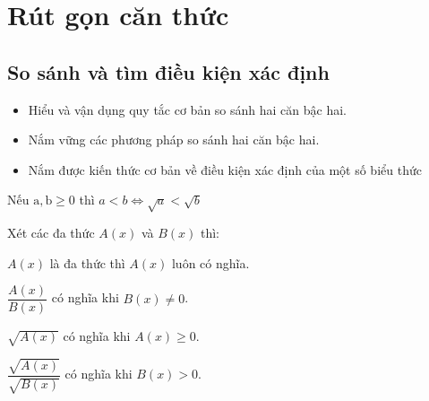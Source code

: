 \titlespacing*{\subsubsection}{0cm}{0pt}{0pt}
\chapter{Rút gọn căn thức}
\section{So sánh  và tìm điều kiện xác định }
\begin{MuctieuH}
	\begin{itemize}
		\item Hiểu và vận dụng quy tắc cơ bản so sánh hai căn bậc hai.
		\item Nắm vững các phương pháp so sánh hai căn bậc hai.
		\item Nắm được kiến thức cơ bản về điều kiện xác định của một số biểu thức
	\end{itemize}
\end{MuctieuH}
	\vspace{-0.25cm}\begin{mylt}
		
		Nếu $\mathrm{a}, \mathrm{b} \geq 0$ thì $a<b \Leftrightarrow \sqrt{a} <\sqrt{b} $
		
		Xét các đa thức $A(x)$ và $B(x)$ thì:
		\begin{enumEX}{2}
			\item $A(x)$ là đa thức thì $A(x)$ luôn có nghĩa.
			\item $\dfrac{A(x)}{B(x)}$ có nghĩa khi $B(x) \neq 0$.
			\item $\sqrt{A(x)}$ có nghĩa khi $A(x) \geq 0$.
			\item $\dfrac{\sqrt{A(x)}}{\sqrt{B(x)}}$ có nghĩa khi $B(x) > 0$.
		\end{enumEX}
	\end{mylt}
	\vspace{0.25cm}
